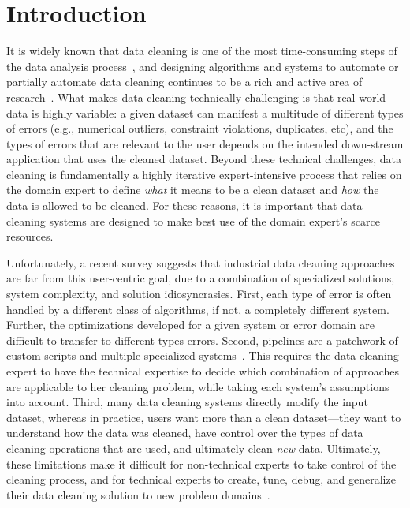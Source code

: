 \section{Introduction}\label{intro}\sloppy



It is widely known that data cleaning is one of the most time-consuming steps of the data analysis process~\cite{nytimes}, and
designing algorithms and systems to automate or partially automate data cleaning continues to be a rich and active area of research~\cite{DBLP:conf/sigmod/ChuIKW16}.
What makes data cleaning technically challenging is that real-world data is highly variable: a given dataset can manifest a multitude of different types of errors (e.g., numerical outliers, constraint violations, duplicates, etc), and the types of errors that are relevant to the user depends on the intended down-stream application that uses the cleaned dataset.
Beyond these technical challenges, data cleaning is fundamentally a highly iterative expert-intensive process that relies on the domain expert to define {\it what} it means to be a clean dataset and {\it how} the data is allowed to be cleaned.
For these reasons, it is important that data cleaning systems are designed to make best use of the domain expert's scarce resources.


Unfortunately, a recent survey suggests that industrial data cleaning approaches are far from this user-centric goal, due to a combination of specialized solutions, system complexity, and solution idiosyncrasies.  First, each type of error is often handled by a different class of algorithms, if not, a completely different system.  Further, the optimizations developed for a given system or error domain are difficult to transfer to different types errors.   Second, pipelines are a patchwork of custom scripts and multiple specialized systems~\cite{krishnan2016hilda}.  This requires the data cleaning expert to have the technical expertise to decide which combination of approaches are applicable to her cleaning problem, while taking each system's assumptions into account.  Third, many data cleaning systems directly modify the input dataset, whereas in practice, users want more than a clean dataset---they want to understand how the data was cleaned, have control over the types of data cleaning operations that are used, and ultimately clean {\it new} data.  Ultimately, these limitations make it difficult for non-technical experts to take control of the cleaning process, and for technical experts to create, tune, debug, and generalize their data cleaning solution to new problem domains~\cite{sculley2014machine,krishnan2016hilda}.

